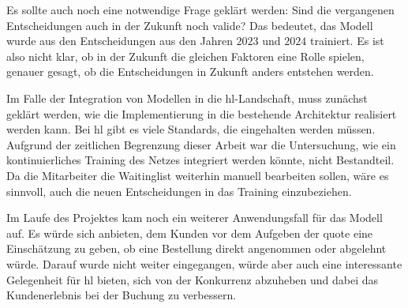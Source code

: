 Es sollte auch noch eine notwendige Frage geklärt werden: Sind die vergangenen Entscheidungen auch in der Zukunft noch valide? 
Das bedeutet, das Modell wurde aus den Entscheidungen aus den Jahren $2023$ und $2024$ trainiert. 
Es ist also nicht klar, ob in der Zukunft die gleichen Faktoren eine Rolle spielen, genauer gesagt, ob die Entscheidungen in Zukunft anders entstehen werden.

Im Falle der Integration von Modellen in die \gls{hl}-Landschaft, muss zunächst geklärt werden, wie die Implementierung in die bestehende Architektur realisiert werden kann. 
Bei \gls{hl} gibt es viele Standards, die eingehalten werden müssen. 
Aufgrund der zeitlichen Begrenzung dieser Arbeit war die Untersuchung, wie ein kontinuierliches Training des Netzes integriert werden könnte, nicht Bestandteil.
Da die Mitarbeiter die Waitinglist weiterhin manuell bearbeiten sollen, wäre es sinnvoll, auch die neuen Entscheidungen in das Training einzubeziehen.

Im Laufe des Projektes kam noch ein weiterer Anwendungsfall für das Modell auf. 
Es würde sich anbieten, dem Kunden vor dem Aufgeben der \gls{quote} eine Einschätzung zu geben, ob eine Bestellung direkt angenommen oder abgelehnt würde. 
Darauf wurde nicht weiter eingegangen, würde aber auch eine interessante Gelegenheit für \gls{hl} bieten, sich von der Konkurrenz abzuheben und dabei das Kundenerlebnis bei der Buchung zu verbessern.


